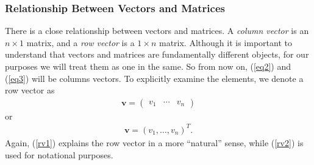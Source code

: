 \documentclass[10pt]{article}
\newcommand{\mydef}[1]{\textcolor{SteelBlue3}{\textit{#1}}} %
\begin{document}
\subsubsection{Relationship Between Vectors and Matrices}
There is a close relationship between vectors and matrices. A \mydef{column vector} is an $n \times 1$ matrix, and a \mydef{row vector} is a $1 \times n$ matrix. Although it is important to understand that vectors and matrices are fundamentally different objects, for our purposes we will treat them as one in the same. So from now on, (\ref{eq2}) and (\ref{eq3}) will be columns vectors. To explicitly examine the elements, we denote a row vector as 
\begin{align}
    \label{rv1}
    \mathbf{v} = \begin{pmatrix}
        v_1 & \cdots & v_n
    \end{pmatrix}
\end{align}
or 
\begin{align}
    \label{rv2}
    \mathbf{v} = (v_1,\ldots,v_n)^T.
\end{align}
Again, (\ref{rv1}) explains the row vector in a more ``natural'' sense, while (\ref{rv2}) is used for notational purposes. 
\end{document}
